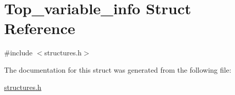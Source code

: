 \hypertarget{structTop__variable__info}{}\section{Top\+\_\+variable\+\_\+info Struct Reference}
\label{structTop__variable__info}


{\ttfamily \#include $<$structures.\+h$>$}



The documentation for this struct was generated from the following file\+:\begin{DoxyCompactItemize}
\item 
\hyperlink{structures_8h}{structures.\+h}\end{DoxyCompactItemize}

